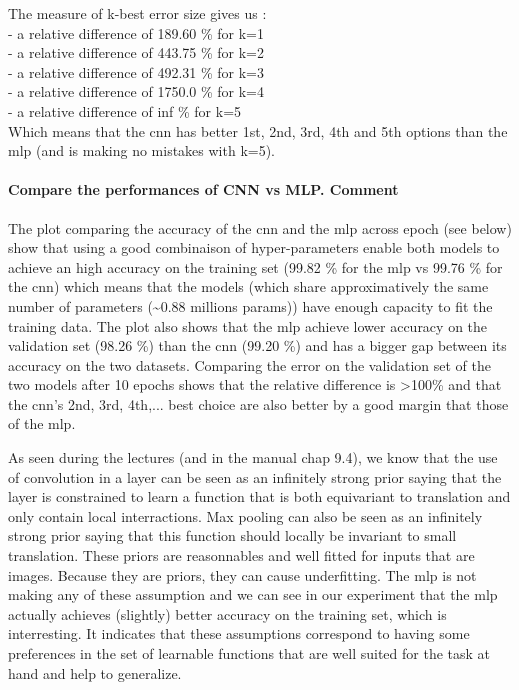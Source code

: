 \documentclass[11pt]{article}
\begin{document}
The measure of k-best error size gives us :\\
- a relative difference of 189.60 \% for k=1\\
- a relative difference of 443.75 \% for k=2\\
- a relative difference of 492.31 \% for k=3\\
- a relative difference of 1750.0 \% for k=4\\
- a relative difference of inf \% for k=5\\
Which means that the cnn has better 1st, 2nd, 3rd, 4th and 5th options
than the mlp (and is making no mistakes with k=5).

    \paragraph{Compare the performances of CNN vs MLP.
Comment}\label{compare-the-performances-of-cnn-vs-mlp.-comment}

The plot comparing the accuracy of the cnn and the mlp across epoch (see
below) show that using a good combinaison of hyper-parameters enable
both models to achieve an high accuracy on the training set (99.82 \%
for the mlp vs 99.76 \% for the cnn) which means that the models (which
share approximatively the same number of parameters
(\textasciitilde{}0.88 millions params)) have enough capacity to fit the
training data. The plot also shows that the mlp achieve lower accuracy
on the validation set (98.26 \%) than the cnn (99.20 \%) and has a
bigger gap between its accuracy on the two datasets. Comparing the error
on the validation set of the two models after 10 epochs shows that the
relative difference is \textgreater{}100\% and that the cnn's 2nd, 3rd,
4th,... best choice are also better by a good margin that those of the
mlp.

As seen during the lectures (and in the manual chap 9.4), we know that
the use of convolution in a layer can be seen as an infinitely strong
prior saying that the layer is constrained to learn a function that is
both equivariant to translation and only contain local interractions.
Max pooling can also be seen as an infinitely strong prior saying that
this function should locally be invariant to small translation. These
priors are reasonnables and well fitted for inputs that are images.
Because they are priors, they can cause underfitting. The mlp is not
making any of these assumption and we can see in our experiment that the
mlp actually achieves (slightly) better accuracy on the training set,
which is interresting. It indicates that these assumptions correspond to
having some preferences in the set of learnable functions that are well
suited for the task at hand and help to generalize.
\end{document}
